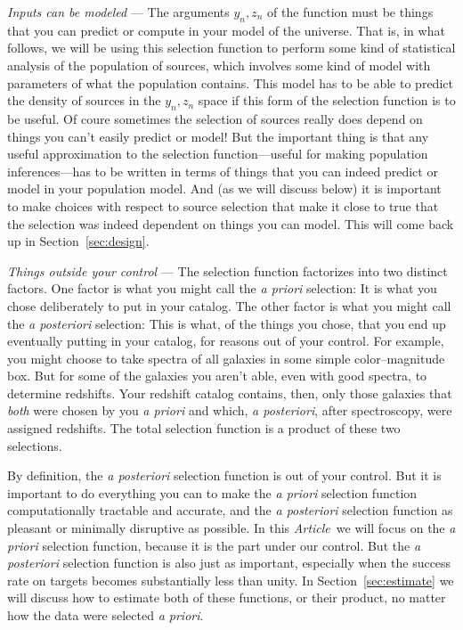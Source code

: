\documentclass[modern]{aastex62}
\newcommand{\documentname}{\textsl{Article}}
\newcommand{\sectionname}{Section}
\newcommand{\foreign}[1]{\textsl{#1}}
\renewcommand{\paragraph}[1]{\medskip\noindent\textit{#1} ---}
\begin{document}
\paragraph{Inputs can be modeled}
The arguments $y_n, z_n$ of the function must be things
that you can predict or compute in your model of the universe.
That is, in what follows, we will be using this selection function to
perform some kind of statistical analysis of the population of
sources, which involves some kind of model with parameters of what the
population contains.
This model has to be able to predict the density of sources in the
$y_n, z_n$ space if this form of the selection function is to be
useful.
Of coure sometimes the selection of sources really does depend on
things you can't easily predict or model!
But the important thing is that any useful approximation to the
selection function---useful for making population inferences---has to
be written in terms of things that you can indeed predict or model in
your population model.
And (as we will discuss below) it is important to make choices with
respect to source selection that make it close to true that the
selection was indeed dependent on things you can model.
This will come back up in \sectionname~\ref{sec:design}.

\paragraph{Things outside your control}
The selection function factorizes into two distinct factors.
One factor is what you might call the \foreign{a priori} selection:
It is what you chose deliberately to put in your catalog.
The other factor is what you might call the \foreign{a posteriori}
selection:
This is what, of the things you chose, that you end up eventually
putting in your catalog, for reasons out of your control.
For example, you might choose to take spectra of all galaxies in some
simple color--magnitude box.
But for some of the galaxies you aren't able, even with good spectra,
to determine redshifts.
Your redshift catalog contains, then, only those galaxies that
\emph{both} were chosen by you \foreign{a priori} and which,
\foreign{a posteriori}, after spectroscopy, were assigned redshifts.
The total selection function is a product of these two selections.

By definition, the \foreign{a posteriori} selection function is out of
your control.
But it is important to do everything you can to make the \foreign{a
  priori} selection function computationally tractable and accurate,
and the \foreign{a posteriori} selection function as pleasant or
minimally disruptive as possible.
In this \documentname\ we will focus on the \foreign{a priori}
selection function, because it is the part under our control.
But the \foreign{a posteriori} selection function is also just as
important, especially when the success rate on targets becomes
substantially less than unity.
In \sectionname~\ref{sec:estimate} we will discuss how to estimate
both of these functions, or their product, no matter how the data
were selected \foreign{a priori}.
\end{document}
